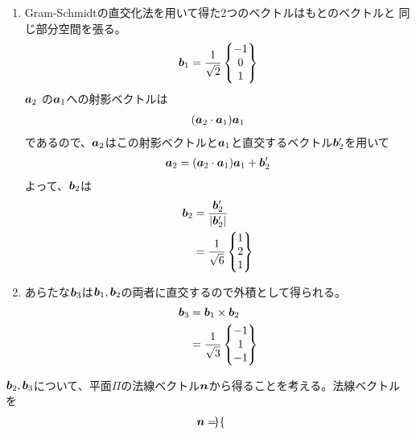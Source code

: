\begin{ans*}
  ${}$
  \begin{enumerate}[label=(\arabic*)]
    \item Gram-Schmidtの直交化法を用いて得た2つのベクトルはもとのベクトルと
    同じ部分空間を張る。
    \begin{gather}
      {\bm{b}}_1 = \frac{1}{\sqrt{2}}
      \begin{Bmatrix}
      -1 \\ 0 \\ 1
      \end{Bmatrix}
    \end{gather}
    ${\bm{a}}_2$ の${\bm{a}}_1$への射影ベクトルは
    \begin{gather}
      ({\bm{a}}_2\cdot{\bm{a}}_1){\bm{a}}_1
    \end{gather}
    であるので、${\bm{a}}_2$はこの射影ベクトルと${\bm{a}}_1$と直交するベクトル${\bm{b}}'_2$を用いて
    \begin{gather}
      {\bm{a}}_2 = ({\bm{a}}_2\cdot{\bm{a}}_1){\bm{a}}_1 + {\bm{b}}'_2
    \end{gather}
    よって、${\bm{b}}_2$は
    \begin{align}
      {\bm{b}}_2 
      &=
      \frac{{\bm{b}}'_2}{|{\bm{b}}'_2|} \\
      &=
      \frac{1}{\sqrt{6}}
      \begin{Bmatrix}
        1 \\ 2 \\ 1
      \end{Bmatrix}
    \end{align}
    \item あらたな${\bm{b}}_3$は${\bm{b}}_1,{\bm{b}}_2$の両者に直交するので外積として得られる。
    \begin{align}
      {\bm{b}}_3
      &=
      {\bm{b}}_1 \times {\bm{b}}_2 \\
      &=
      \frac{1}{\sqrt{3}}
      \begin{Bmatrix}
        -1 \\ 1 \\ -1
      \end{Bmatrix}
    \end{align}
  \end{enumerate}
  \begin{other*}
    ${\bm{b}}_2,{\bm{b}}_3$について、平面$\Pi$の法線ベクトル${\bm{n}}$から得ることを考える。法線ベクトルを
    \begin{gather}
      {\bm{n}} =
      \begin{Bmatrix}

\end{Bmatrix}
\end{gather}
\end{other*}
\end{ans*}
